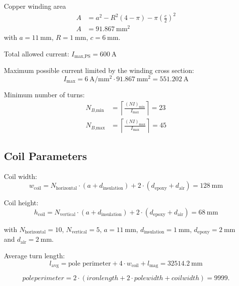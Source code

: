 \documentclass[10pt,a4paper,noendnumber=true]{scrartcl}
\begin{document}
Copper winding area
\begin{align}
A &= a^2- R^2 (4-\pi) - \pi \left(\frac{c}{2}\right)^2\\
A &= \SI{91.867}{\mm\squared}
\end{align}
with $a=\SI{11}{\mm}$, $R=\SI{1}{\mm}$, $c=\SI{6}{\mm}$.

Total allowed current: $I_\text{max,PS} = \SI{600}{\ampere}$

Maximum possible current limited by the winding cross section:
\begin{equation}
I_\text{max} = \SI{6}{\ampere\per\mm\squared} \cdot \SI{91.867}{\mm\squared} = \SI{551.202}{\ampere}
\end{equation}

Minimum number of turns:
\begin{align}
    N_{B\text{,min}} &= \left\lceil\frac{(NI)_\text{min}}{I_\text{max}}\right\rceil = 23\\
    N_{B\text{,max}} &= \left\lceil\frac{(NI)_\text{max}}{I_\text{max}}\right\rceil = 45
\end{align}

\subsection{Coil Parameters}
Coil width:
\begin{equation}
    w_\text{coil}=N_\text{horizontal} \cdot (a+d_\text{insulation}) + 2\cdot(d_\text{epoxy} + d_\text{air}) = \SI{128}{\mm}
\end{equation}

Coil height:
\begin{equation}
    h_\text{coil}=N_\text{vertical} \cdot (a+d_\text{insulation}) + 2\cdot(d_\text{epoxy} + d_\text{air}) = \SI{68}{\mm}
\end{equation}

with $N_\text{horizontal}=10$, $N_\text{vertical}=5$, $a=\SI{11}{\mm}$, $d_\text{insulation}=\SI{1}{\mm}$, $d_\text{epoxy}=\SI{2}{\mm}$ and $d_\text{air}=\SI{2}{\mm}$.


Average turn length:
\begin{equation}
    l_\text{avg}= \text{pole perimeter} + 4 \cdot w_\text{coil} + l_\text{mag} = \SI{32514.2}{\mm}
\end{equation}

\begin{equation}
pole perimeter = 2 \cdot (iron length + 2 \cdot pole width + coil width) = 9999.
\end{equation}
\end{document}
